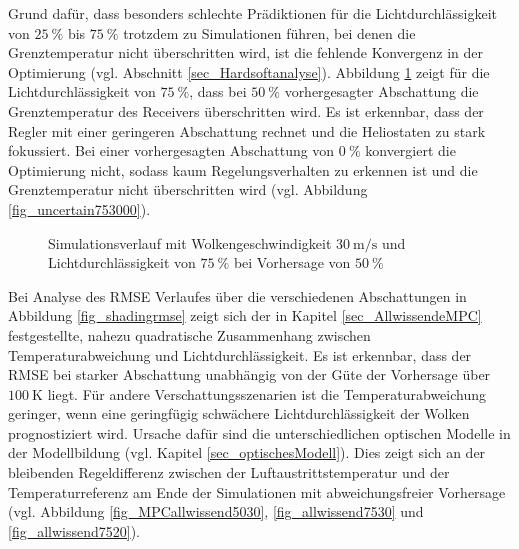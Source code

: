 Grund dafür, dass besonders schlechte Prädiktionen für die Lichtdurchlässigkeit von $\SI{25}{\percent}$ bis $\SI{75}{\percent}$ trotzdem zu Simulationen führen, bei denen die Grenztemperatur nicht überschritten wird, ist die fehlende Konvergenz in der Optimierung (vgl. Abschnitt \ref{sec_Hardsoftanalyse}).
Abbildung \ref{fig_uncertain753050} zeigt für die Lichtdurchlässigkeit von $\SI{75}{\percent}$, dass bei $\SI{50}{\percent}$ vorhergesagter Abschattung die Grenztemperatur des Receivers überschritten wird.
Es ist erkennbar, dass der Regler mit einer geringeren Abschattung rechnet und die Heliostaten zu stark fokussiert.
Bei einer vorhergesagten Abschattung von $\SI{0}{\percent}$ konvergiert die Optimierung nicht, sodass kaum Regelungsverhalten zu erkennen ist und die Grenztemperatur nicht überschritten wird (vgl. Abbildung \ref{fig_uncertain753000}).

\begin{figure}[h!]
    \centering
    \setlength{\fboxsep}{1pt}
    \setlength{\fboxrule}{1pt}
    \caption[Simulationsverlauf mit Wolkengeschwindigkeit $\SI{30}{\metre\per\second}$ und Lichtdurchlässigkeit von $\SI{75}{\percent}$ bei Vorhersage von $\SI{50}{\percent}$]{Simulationsverlauf mit Wolkengeschwindigkeit $\SI{30}{\metre\per\second}$ und Lichtdurchlässigkeit von $\SI{75}{\percent}$ bei Vorhersage von $\SI{50}{\percent}$}
    \label{fig_uncertain753050}
\end{figure}

Bei Analyse des RMSE Verlaufes über die verschiedenen Abschattungen in Abbildung \ref{fig_shadingrmse} zeigt sich der in Kapitel \ref{sec_AllwissendeMPC} festgestellte, nahezu quadratische Zusammenhang zwischen Temperaturabweichung und Lichtdurchlässigkeit.
Es ist erkennbar, dass der RMSE bei starker Abschattung unabhängig von der Güte der Vorhersage über $\SI{100}{\kelvin}$ liegt.
Für andere Verschattungsszenarien ist die Temperaturabweichung geringer, wenn eine geringfügig schwächere Lichtdurchlässigkeit der Wolken prognostiziert wird.
Ursache dafür sind die unterschiedlichen optischen Modelle in der Modellbildung (vgl. Kapitel \ref{sec_optischesModell}).
Dies zeigt sich an der bleibenden Regeldifferenz zwischen der Luftaustrittstemperatur und der Temperaturreferenz am Ende der Simulationen mit abweichungsfreier Vorhersage (vgl. Abbildung \ref{fig_MPCallwissend5030}, \ref{fig_allwissend7530} und \ref{fig_allwissend7520}).

